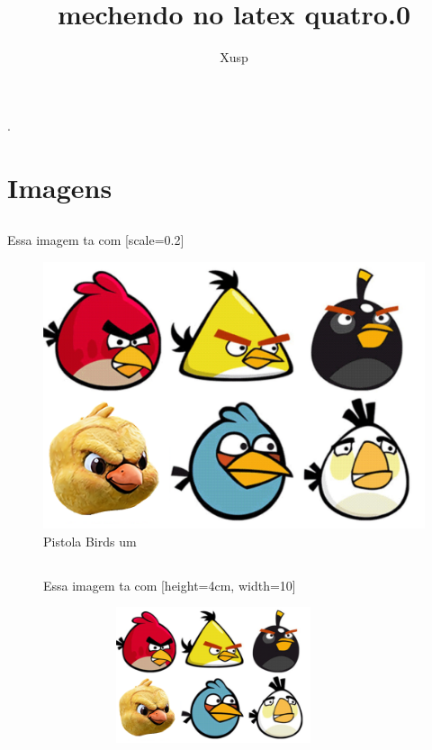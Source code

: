 \documentclass[a4paper,11pt]{report}
\title{mechendo no latex quatro.0}
\author{Xusp}
\begin{document}
\maketitle
\tableofcontents
\listoffigures.
\chapter{Imagens}
\section{}
Essa imagem ta com [scale=0.2]
\begin{figure}
\includegraphics[scale=0.2]{Pistola_Birds.png}
\caption{Pistola Birds um}\label{imagemprimeira}
\end{figure}
\section{}
\begin{figure}[htpb]
Essa imagem ta com [height=4cm, width=10]
\begin{center}
\includegraphics[height=4cm, width=10cm]{Pistola_Birds.png}
\end{center}
\end{figure}
\end{document}
